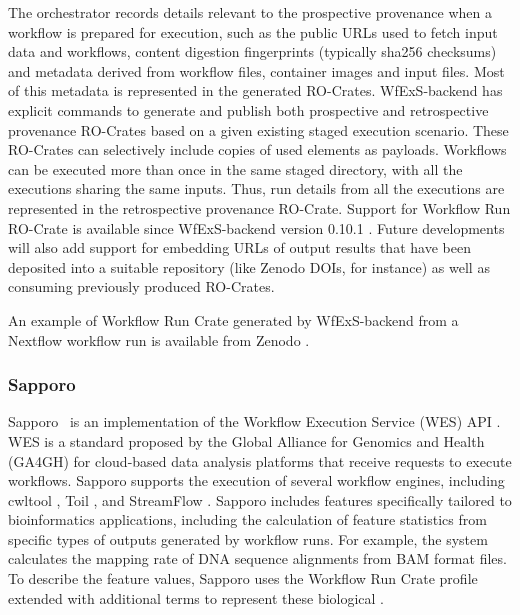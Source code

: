 The orchestrator records details relevant to the prospective provenance when a workflow is prepared for execution, such as the public URLs used to fetch input data and workflows, content digestion fingerprints (typically sha256 checksums) and metadata derived from workflow files, container images and input files.
Most of this metadata is represented in the generated RO-Crates. WfExS-backend has explicit commands to generate and publish both prospective and retrospective provenance RO-Crates based on a given existing staged execution scenario.
These RO-Crates can selectively include copies of used elements as payloads.
Workflows can be executed more than once in the same staged directory, with all the executions sharing the same inputs.
Thus, run details from all the executions are represented in the retrospective provenance RO-Crate. Support for Workflow Run RO-Crate is available since WfExS-backend version 0.10.1 \cite{Fernández 2023a}.
Future developments will also add support for embedding URLs of output results that have been deposited into a suitable repository (like Zenodo DOIs, for instance) as well as consuming previously produced RO-Crates.

An example of Workflow Run Crate generated by WfExS-backend from a Nextflow workflow run \cite{Bouyssié 2023} is available from Zenodo \cite{Fernández 2023b}.


\subsubsection{Sapporo}\label{ch54:sapporo}

Sapporo~\cite{Suetake 2022} is an implementation of the Workflow Execution Service (WES) API .
WES is a standard proposed by the Global Alliance for Genomics and Health (GA4GH) for cloud-based data analysis platforms that receive requests to execute workflows.
Sapporo supports the execution of several workflow engines, including cwltool \cite{Amstutz 2023}, Toil \cite{Vivian 2017}, and StreamFlow \cite{Colonnelli 2021}.
Sapporo includes features specifically tailored to bioinformatics applications, including the calculation of feature statistics from specific types of outputs generated by workflow runs.
For example, the system calculates the mapping rate of DNA sequence alignments from BAM format files.
To describe the feature values, Sapporo uses the Workflow Run Crate profile extended with additional terms to represent these biological .

